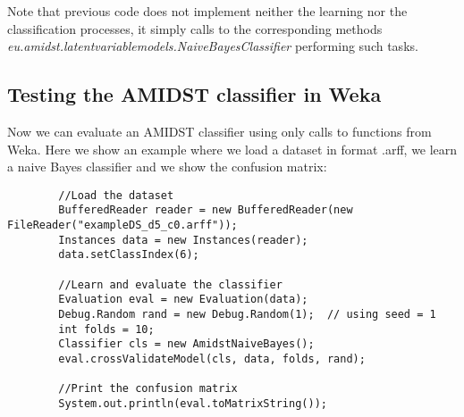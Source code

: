 \documentclass[10pt,a4paper]{article}
\begin{document}
Note that previous code does not implement neither the learning \linebreak nor the classification processes, it simply calls to the corresponding methods \textit{eu.amidst.latentvariablemodels.NaiveBayesClassifier} performing such tasks. 


\subsection{Testing the AMIDST classifier in Weka}

Now we can evaluate an AMIDST classifier using only calls to functions from Weka. Here we show an example where we load a dataset in format .arff, we learn a naive Bayes classifier and we show the confusion matrix:

\begin{verbatim}
        //Load the dataset
        BufferedReader reader = new BufferedReader(new FileReader("exampleDS_d5_c0.arff"));
        Instances data = new Instances(reader);
        data.setClassIndex(6);
        
        //Learn and evaluate the classifier
        Evaluation eval = new Evaluation(data);
        Debug.Random rand = new Debug.Random(1);  // using seed = 1
        int folds = 10;
        Classifier cls = new AmidstNaiveBayes();
        eval.crossValidateModel(cls, data, folds, rand);
        
        //Print the confusion matrix
        System.out.println(eval.toMatrixString());
\end{verbatim}
\end{document}
